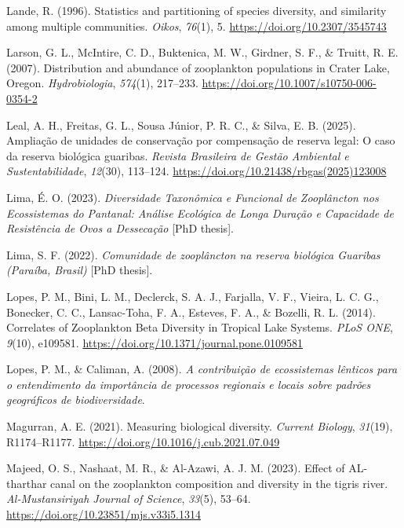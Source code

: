 \documentclass[
  letterpaper,
  DIV=11,
  numbers=noendperiod]{scrartcl}
\newlength{\cslhangindent}
\newenvironment{CSLReferences}[2] %
 {\begin{list}{}{%
  \setlength{\itemindent}{0pt}
  \setlength{\leftmargin}{0pt}
  \setlength{\parsep}{0pt}
  \ifodd #1
   \setlength{\leftmargin}{\cslhangindent}
   \setlength{\itemindent}{-1\cslhangindent}
  \fi
  \setlength{\itemsep}{#2\baselineskip}}}
 {\end{list}}
\begin{document}
\begin{CSLReferences}{1}{0}
Lande, R. (1996). Statistics and partitioning of species diversity, and
similarity among multiple communities. \emph{Oikos}, \emph{76}(1), 5.
\url{https://doi.org/10.2307/3545743}

Larson, G. L., McIntire, C. D., Buktenica, M. W., Girdner, S. F., \&
Truitt, R. E. (2007). Distribution and abundance of zooplankton
populations in Crater Lake, Oregon. \emph{Hydrobiologia}, \emph{574}(1),
217--233. \url{https://doi.org/10.1007/s10750-006-0354-2}

Leal, A. H., Freitas, G. L., Sousa Júnior, P. R. C., \& Silva, E. B.
(2025). Ampliação de unidades de conservação por compensação de reserva
legal: O caso da reserva biológica guaribas. \emph{Revista Brasileira de
Gestão Ambiental e Sustentabilidade}, \emph{12}(30), 113--124.
\url{https://doi.org/10.21438/rbgas(2025)123008}

Lima, É. O. (2023). \emph{Diversidade Taxonômica e Funcional de
Zooplâncton nos Ecossistemas do Pantanal: Análise Ecológica de Longa
Duração e Capacidade de Resistência de Ovos a Dessecação} {[}PhD
thesis{]}.

Lima, S. F. (2022). \emph{Comunidade de zooplâncton na reserva biológica
Guaribas (Paraíba, Brasil)} {[}PhD thesis{]}.

Lopes, P. M., Bini, L. M., Declerck, S. A. J., Farjalla, V. F., Vieira,
L. C. G., Bonecker, C. C., Lansac-Toha, F. A., Esteves, F. A., \&
Bozelli, R. L. (2014). Correlates of Zooplankton Beta Diversity in
Tropical Lake Systems. \emph{PLoS ONE}, \emph{9}(10), e109581.
\url{https://doi.org/10.1371/journal.pone.0109581}

Lopes, P. M., \& Caliman, A. (2008). \emph{A contribuição de
ecossistemas lênticos para o entendimento da importância de processos
regionais e locais sobre padrões geográficos de biodiversidade}.

Magurran, A. E. (2021). Measuring biological diversity. \emph{Current
Biology}, \emph{31}(19), R1174--R1177.
\url{https://doi.org/10.1016/j.cub.2021.07.049}

Majeed, O. S., Nashaat, M. R., \& Al-Azawi, A. J. M. (2023). Effect of
AL-tharthar canal on the zooplankton composition and diversity in the
tigris river. \emph{Al-Mustansiriyah Journal of Science}, \emph{33}(5),
53--64. \url{https://doi.org/10.23851/mjs.v33i5.1314}


\end{CSLReferences}
\end{document}
